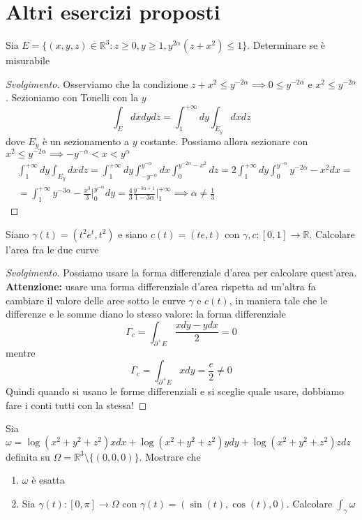 \chapter{Altri esercizi proposti}
\pagestyle{plain}
\thispagestyle{empty}
\pagestyle{fancy}
\begin{exercise}
	Sia $E=\{(x, y, z) \in \mathbb{R}^3 : z \geq 0, y \geq 1, y^{2 \alpha}(z + x^2) \leq 1 \}$. Determinare se è misurabile
\end{exercise}
\begin{proof}[Svolgimento]
	Osserviamo che la condizione $z + x^2 \leq y^{-2 \alpha} \implies 0 \leq y^{-2\alpha}$ e $x^2 \leq y^{-2 \alpha}$. Sezioniamo con Tonelli con la $y$
	$$
	\int_E dxdydz = \int_1^{+\infty} dy \int_{E_y} dxdz
	$$
	dove $E_y$ è un sezionamento a $y$ costante. Possiamo allora sezionare con $x^2 \leq y^{-2\alpha} \implies -y^{-\alpha} < x < y^{\alpha}$
	\begin{align*}
	&\int_1^{+\infty} dy \int_{E_y} dxdz = \int_1^{+\infty} dy \int_{-y^{-\alpha}}^{y^{-\alpha}} dx \int_0^{y^{-2 \alpha} - x^2} dz = 2 \int_1^{+\infty} dy \int_0^{y^{-\alpha}} y^{-2 \alpha} - x^2 dx = \\
	&=\int_1^{+\infty} y^{-3 \alpha} - \frac{x^3}{3}\Bigg|_0^{y^{-\alpha}} dy = \frac{4}{3} \frac{y^{-3\alpha + 1}}{1 - 3 \alpha}\Bigg|_1^{+\infty} \implies \alpha \neq \frac{1}{3}
	\end{align*}
\end{proof}
\begin{exercise}
Siano $\gamma(t)=(t^2 e^t, t^2)$ e siano $c(t)=(te, t)$ con $\gamma, c:[0,1] \to \mathbb{R}$. Calcolare l'area fra le due curve
\end{exercise}
\begin{proof}[Svolgimento]
	Possiamo usare la forma differenziale d'area per calcolare quest'area. \textbf{Attenzione:} usare una forma differenziale d'area rispetta ad un'altra fa cambiare il valore delle aree sotto le curve $\gamma$ e $c(t)$, in maniera tale che le differenze e le somme diano lo stesso valore: la forma differenziale
	$$
	\Gamma_c = \int_{\partial^{+} E} \frac{xdy - ydx}{2} = 0
	$$
	mentre
	$$
	\Gamma_c = \int_{\partial^{+} E} xdy = \frac{e}{2} \neq 0
	$$
	Quindi quando si usano le forme differenziali e si sceglie quale usare, dobbiamo fare i conti tutti con la stessa!
\end{proof}
\begin{exercise}
	Sia $\omega = \log(x^2 + y^2 + z^2)xdx + \log(x^2+y^2+z^2)ydy + \log(x^2+y^2+z^2)zdz$ definita su $\Omega = \mathbb{R}^3 \setminus \{(0, 0, 0)\}$. Mostrare che 
	\begin{enumerate}
		\item $\omega$ è esatta
		\item Sia $\gamma(t) : [0, \pi] \to \Omega$ con $\gamma(t) = (\sin(t), \cos(t), 0)$. Calcolare $\int_{\gamma} \omega$
	\end{enumerate}
\end{exercise}